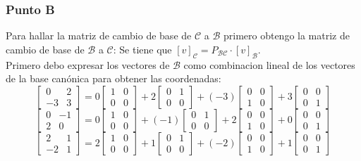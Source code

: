 \documentclass[a4paper,12pt]{article}
\begin{document}
\subsubsection{Punto B}
Para hallar la matriz de cambio de base de $\mathcal{C}$ a $\mathcal{B}$ primero obtengo la matriz de cambio de base de $\mathcal{B}$ a $\mathcal{C}$:
Se tiene que $[v]_{\mathcal{C}} = P_{\mathcal{B} \mathcal{C}} \cdot [v]_{\mathcal{B}}$. \\
Primero debo expresar los vectores de $\mathcal{B}$ como combinacion lineal de los vectores de la base canónica para obtener las coordenadas:
$$
\begin{bmatrix}
    0 & 2 \\
    -3 & 3
\end{bmatrix}
= 0\begin{bmatrix}
    1 & 0 \\
    0 & 0
\end{bmatrix}
+2\begin{bmatrix}
    0 & 1 \\
    0 & 0
\end{bmatrix}
+(-3)\begin{bmatrix}
    0 & 0 \\
    1 & 0
\end{bmatrix}
+3\begin{bmatrix}
    0 & 0 \\
    0 & 1
\end{bmatrix}
$$
$$
\begin{bmatrix}
    0 & -1 \\
    2 & 0
\end{bmatrix}
= 0\begin{bmatrix}
    1 & 0 \\
    0 & 0
\end{bmatrix}
+(-1)\begin{bmatrix}
    0 & 1 \\
    0 & 0
\end{bmatrix}
+2\begin{bmatrix}
    0 & 0 \\
    1 & 0
\end{bmatrix}
+0\begin{bmatrix}
    0 & 0 \\
    0 & 1
\end{bmatrix}
$$
$$
\begin{bmatrix}
    2 & 1 \\
    -2 & 1
\end{bmatrix}
= 2\begin{bmatrix}
    1 & 0 \\
    0 & 0
\end{bmatrix}
+1\begin{bmatrix}
    0 & 1 \\
    0 & 0
\end{bmatrix}
+(-2)\begin{bmatrix}
    0 & 0 \\
    1 & 0
\end{bmatrix}
+1\begin{bmatrix}
    0 & 0 \\
    0 & 1
\end{bmatrix}
$$
\end{document}

